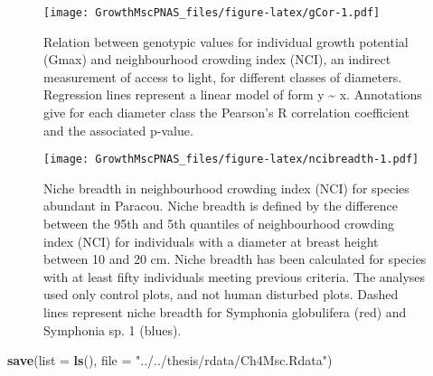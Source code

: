\documentclass[
]{article}
\newenvironment{Shaded}{\begin{snugshade}}{\end{snugshade}}
\newcommand{\DataTypeTok}[1]{\textcolor[rgb]{0.13,0.29,0.53}{#1}}
\newcommand{\KeywordTok}[1]{\textcolor[rgb]{0.13,0.29,0.53}{\textbf{#1}}}
\newcommand{\NormalTok}[1]{#1}
\newcommand{\StringTok}[1]{\textcolor[rgb]{0.31,0.60,0.02}{#1}}
\begin{document}
\newpage

\begin{figure}
\centering
\texttt{[image: GrowthMscPNAS\_files/figure-latex/gCor-1.pdf]}
\caption{\label{fig:gCor}Relation between genotypic values for individual growth potential (Gmax) and neighbourhood crowding index (NCI), an indirect measurement of access to light, for different classes of diameters. Regression lines represent a linear model of form y \textasciitilde{} x. Annotations give for each diameter class the Pearson's R correlation coefficient and the associated p-value.}
\end{figure}

\newpage

\begin{figure}
\centering
\texttt{[image: GrowthMscPNAS\_files/figure-latex/ncibreadth-1.pdf]}
\caption{\label{fig:ncibreadth}Niche breadth in neighbourhood crowding index (NCI) for species abundant in Paracou. Niche breadth is defined by the difference between the 95th and 5th quantiles of neighbourhood crowding index (NCI) for individuals with a diameter at breast height between 10 and 20 cm. Niche breadth has been calculated for species with at least fifty individuals meeting previous criteria. The analyses used only control plots, and not human disturbed plots. Dashed lines represent niche breadth for Symphonia globulifera (red) and Symphonia sp. 1 (blues).}
\end{figure}

\begin{Shaded}
\begin{Highlighting}[]
\KeywordTok{save}\NormalTok{(}\DataTypeTok{list =} \KeywordTok{ls}\NormalTok{(), }\DataTypeTok{file =} \StringTok{"../../thesis/rdata/Ch4Msc.Rdata"}\NormalTok{)}
\end{Highlighting}
\end{Shaded}
\end{document}
